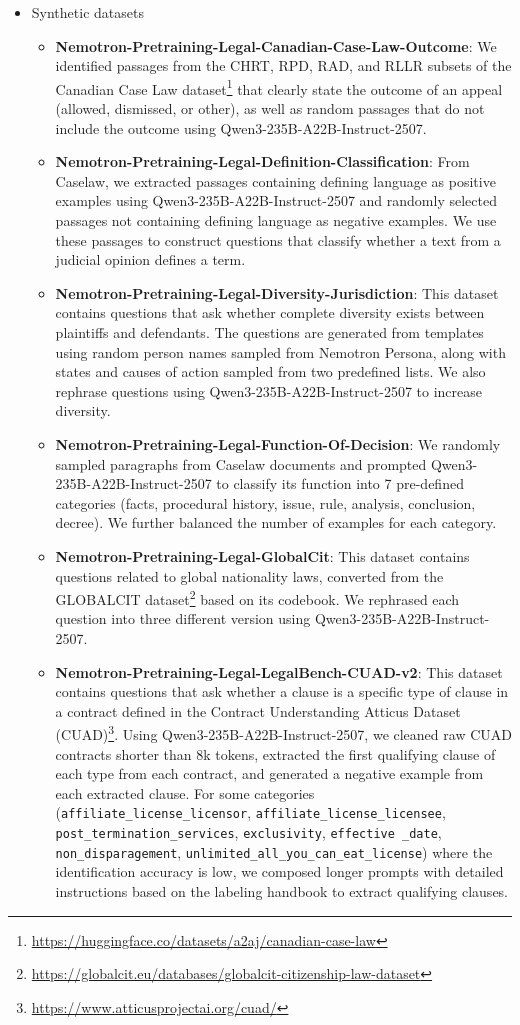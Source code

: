\begin{itemize}
    \item Synthetic datasets
    \begin{itemize}
        \item \textbf{Nemotron-Pretraining-Legal-Canadian-Case-Law-Outcome}: We identified passages from the CHRT, RPD, RAD, and RLLR subsets of the Canadian Case Law dataset\footnote{\url{https://huggingface.co/datasets/a2aj/canadian-case-law}} that clearly state the outcome of an appeal (allowed, dismissed, or other), as well as random passages that do not include the outcome using Qwen3-235B-A22B-Instruct-2507.
        \item \textbf{Nemotron-Pretraining-Legal-Definition-Classification}: From Caselaw, we extracted passages containing defining language as positive examples using Qwen3-235B-A22B-Instruct-2507 and randomly selected passages not containing defining language as negative examples. We use these passages to construct questions that classify whether a text from a judicial opinion defines a term.
        \item \textbf{Nemotron-Pretraining-Legal-Diversity-Jurisdiction}: This dataset contains questions that ask whether complete diversity exists between plaintiffs and defendants. The questions are generated from templates using random person names sampled from Nemotron Persona, along with states and causes of action sampled from two predefined lists. We also rephrase questions using Qwen3-235B-A22B-Instruct-2507 to increase diversity.
        \item \textbf{Nemotron-Pretraining-Legal-Function-Of-Decision}: We randomly sampled paragraphs from Caselaw documents and prompted Qwen3-235B-A22B-Instruct-2507 to classify its function into 7 pre-defined categories (facts, procedural history, issue, rule, analysis, conclusion, decree). We further balanced the number of examples for each category.
        \item \textbf{Nemotron-Pretraining-Legal-GlobalCit}: This dataset contains questions related to global nationality laws, converted from the GLOBALCIT dataset\footnote{\url{https://globalcit.eu/databases/globalcit-citizenship-law-dataset}} based on its codebook. We rephrased each question into three different version using Qwen3-235B-A22B-Instruct-2507.
        \item \textbf{Nemotron-Pretraining-Legal-LegalBench-CUAD-v2}: This dataset contains questions that ask whether a clause is a specific type of clause in a contract defined in the Contract Understanding Atticus Dataset (CUAD)\footnote{\url{https://www.atticusprojectai.org/cuad/}}. Using Qwen3-235B-A22B-Instruct-2507, we cleaned raw CUAD contracts shorter than 8k tokens, extracted the first qualifying clause of each type from each contract, and generated a negative example from each extracted clause. For some categories (\texttt{affiliate\_license\_licensor}, \texttt{affiliate\_license\_licensee}, \texttt{post\_termination\_services}, \texttt{exclusivity}, \texttt{effective \_date}, \texttt{non\_disparagement}, \texttt{unlimited\_all\_you\_can\_eat\_license}) where the identification accuracy is low, we composed longer prompts with detailed instructions based on the labeling handbook to extract qualifying clauses.

\end{itemize}
\end{itemize}
